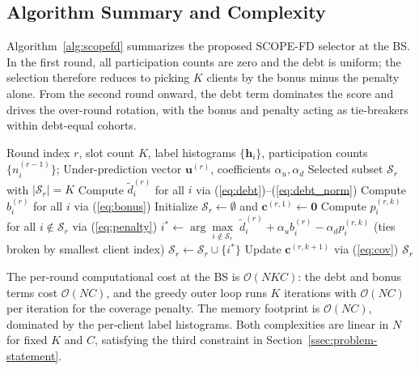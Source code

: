 \documentclass[journal]{IEEEtran}
\begin{document}
\subsection{Algorithm Summary and Complexity}
\label{ssec:algorithm-summary}

Algorithm~\ref{alg:scopefd} summarizes the proposed SCOPE-FD selector at the BS. In the first round, all participation counts are zero and the debt is uniform; the selection therefore reduces to picking $K$ clients by the bonus minus the penalty alone. From the second round onward, the debt term dominates the score and drives the over-round rotation, with the bonus and penalty acting as tie-breakers within debt-equal cohorts.

\begin{algorithm}[t]
\caption{\small SCOPE-FD Selector at Round $r$}
\label{alg:scopefd}
\begin{algorithmic}[1]
\small
\REQUIRE Round index $r$, slot count $K$, label histograms $\{\bm{h}_i\}$, participation counts $\{n_i^{(r-1)}\}$;
\REQUIRE Under-prediction vector $\bm{u}^{(r)}$, coefficients $\alpha_u, \alpha_d$
\ENSURE Selected subset $\mathcal{S}_r$ with $|\mathcal{S}_r|=K$
\STATE Compute $\tilde{d}_i^{(r)}$ for all $i$ via (\ref{eq:debt})--(\ref{eq:debt_norm})
\STATE Compute $b_i^{(r)}$ for all $i$ via (\ref{eq:bonus})
\STATE Initialize $\mathcal{S}_r \leftarrow \emptyset$ and $\bm{c}^{(r,1)} \leftarrow \bm{0}$
    \STATE Compute $p_i^{(r,k)}$ for all $i \notin \mathcal{S}_r$ via (\ref{eq:penalty})
    \STATE $i^{*} \leftarrow \arg\max\limits_{i \notin \mathcal{S}_r}\;\tilde{d}_i^{(r)} + \alpha_u b_i^{(r)} - \alpha_d p_i^{(r,k)}$ (ties broken by smallest client index)
    \STATE $\mathcal{S}_r \leftarrow \mathcal{S}_r \cup \{i^{*}\}$
    \STATE Update $\bm{c}^{(r,k+1)}$ via (\ref{eq:cov})
\ENDFOR
\RETURN $\mathcal{S}_r$
\end{algorithmic}
\end{algorithm}

The per-round computational cost at the BS is $\mathcal{O}(NKC)$: the debt and bonus terms cost $\mathcal{O}(NC)$, and the greedy outer loop runs $K$ iterations with $\mathcal{O}(NC)$ per iteration for the coverage penalty. The memory footprint is $\mathcal{O}(NC)$, dominated by the per-client label histograms. Both complexities are linear in $N$ for fixed $K$ and $C$, satisfying the third constraint in Section~\ref{ssec:problem-statement}.

\end{document}
